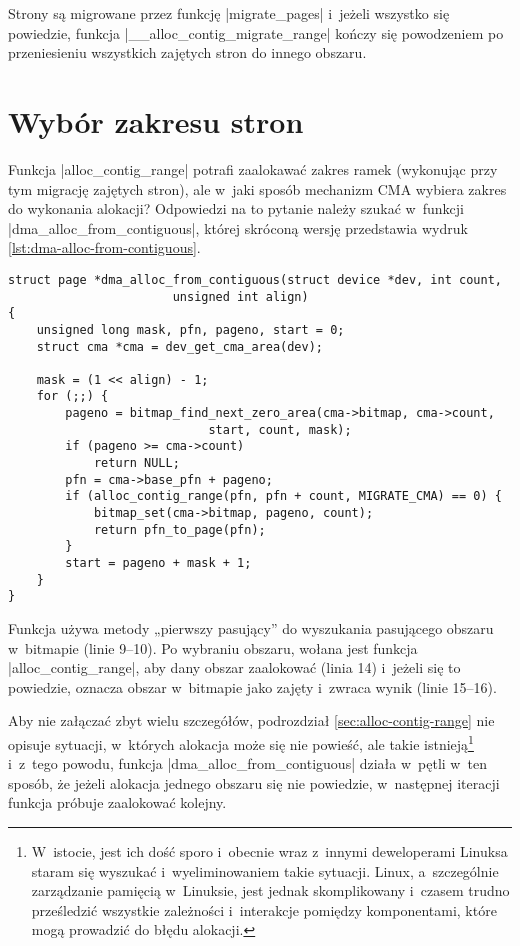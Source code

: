 Strony są migrowane przez funkcję \code|migrate_pages| i~jeżeli
wszystko się powiedzie, funkcja \code|__alloc_contig_migrate_range|
kończy się powodzeniem po przeniesieniu wszystkich zajętych stron do
innego obszaru.


\section{Wybór zakresu stron}\label{sec:alloc-from-contig}

Funkcja \code|alloc_contig_range| potrafi zaalokawać zakres ramek
(wykonując przy tym migrację zajętych stron), ale w~jaki sposób
mechanizm CMA wybiera zakres do wykonania alokacji?  Odpowiedzi na to
pytanie należy szukać w~funkcji \code|dma_alloc_from_contiguous|,
której skróconą wersję przedstawia wydruk
\ref{lst:dma-alloc-from-contiguous}.

\begin{lstlisting}[float=tb,caption={Skrócony wydruk funkcji
    \code|dma_alloc_from_contiguous| z Linuksa
    3.5.},label=lst:dma-alloc-from-contiguous]
struct page *dma_alloc_from_contiguous(struct device *dev, int count,
				       unsigned int align)
{
	unsigned long mask, pfn, pageno, start = 0;
	struct cma *cma = dev_get_cma_area(dev);

	mask = (1 << align) - 1;
	for (;;) {
		pageno = bitmap_find_next_zero_area(cma->bitmap, cma->count,
						    start, count, mask);
		if (pageno >= cma->count)
			return NULL;
		pfn = cma->base_pfn + pageno;
		if (alloc_contig_range(pfn, pfn + count, MIGRATE_CMA) == 0) {
			bitmap_set(cma->bitmap, pageno, count);
			return pfn_to_page(pfn);
		}
		start = pageno + mask + 1;
	}
}
\end{lstlisting}

Funkcja używa metody „pierwszy pasujący” do wyszukania pasującego
obszaru w~bitmapie (linie 9--10).  Po wybraniu obszaru, wołana jest
funkcja \code|alloc_contig_range|, aby dany obszar zaalokować
(linia 14) i~jeżeli się to powiedzie, oznacza obszar w~bitmapie jako
zajęty i~zwraca wynik (linie 15--16).

Aby nie załączać zbyt wielu szczegółów, podrozdział
\ref{sec:alloc-contig-range} nie opisuje sytuacji, w~których alokacja
może się nie powieść, ale takie istnieją\footnote{W~istocie, jest ich
  dość sporo i~obecnie wraz z~innymi deweloperami Linuksa staram się
  wyszukać i~wyeliminowaniem takie sytuacji.  Linux, a~szczególnie
  zarządzanie pamięcią w~Linuksie, jest jednak skomplikowany i~czasem
  trudno prześledzić wszystkie zależności i~interakcje pomiędzy
  komponentami, które mogą prowadzić do błędu alokacji.} i~z~tego
powodu, funkcja \code|dma_alloc_from_contiguous| działa w~pętli
w~ten sposób, że jeżeli alokacja jednego obszaru się nie powiedzie,
w~następnej iteracji funkcja próbuje zaalokować kolejny.


